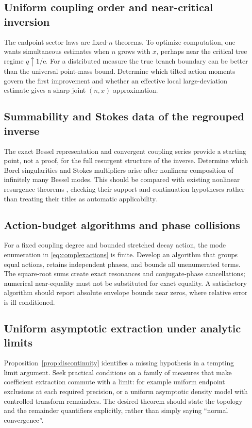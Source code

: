 \documentclass[11pt,a4paper]{article}
\theoremstyle{definition}
\theoremstyle{remark}
\newcommand{\e}{\mathrm e}
\numberwithin{equation}{section}
\begin{document}
\subsection{Uniform coupling order and near-critical inversion}
The endpoint sector laws are fixed-$n$ theorems. To optimize computation, one wants simultaneous estimates when $n$ grows with $x$, perhaps near the critical tree regime $q\uparrow1/\e$. For a distributed measure the true branch boundary can be better than the universal point-mass bound. Determine which tilted action moments govern the first improvement and whether an effective local large-deviation estimate gives a sharp joint $(n,x)$ approximation.

\subsection{Summability and Stokes data of the regrouped inverse}
The exact Bessel representation and convergent coupling series provide a starting point, not a proof, for the full resurgent structure of the inverse. Determine which Borel singularities and Stokes multipliers arise after nonlinear composition of infinitely many Bessel modes. This should be compared with existing nonlinear resurgence theorems \cite{sauzin,kamimoto}, checking their support and continuation hypotheses rather than treating their titles as automatic applicability.

\subsection{Action-budget algorithms and phase collisions}
For a fixed coupling degree and bounded stretched decay action, the mode enumeration in \eqref{eq:complexactions} is finite. Develop an algorithm that groups equal actions, retains independent phases, and bounds all unenumerated terms. The square-root sums create exact resonances and conjugate-phase cancellations; numerical near-equality must not be substituted for exact equality. A satisfactory algorithm should report absolute envelope bounds near zeros, where relative error is ill conditioned.

\subsection{Uniform asymptotic extraction under analytic limits}
Proposition~\ref{prop:discontinuity} identifies a missing hypothesis in a tempting limit argument. Seek practical conditions on a family of measures that make coefficient extraction commute with a limit: for example uniform endpoint exclusions at each required precision, or a uniform asymptotic density model with controlled transform remainders. The desired theorem should state the topology and the remainder quantifiers explicitly, rather than simply saying ``normal convergence''.
\end{document}
